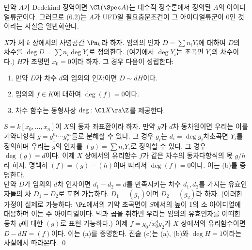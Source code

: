 	
	\begin{example}
	만약 $A$가 Dedekind 정역이면 $\Cl(\Spec A)$는 대수적 정수론에서 정의된 $A$의 아이디얼류군이다.
	그러므로 (6.2)는 $A$가 UFD일 필요충분조건이 그 아이디얼류군이 0인 것이라는 사실을 일반화한다.
	\end{example}
	
	
	\begin{proposition}
	$X$가 체 $k$ 상에서의 사영공간 $\Pn_k$라 하자.
	임의의 인자 $D=\sum n_iY_i$에 대하여 $D$의 차수를 $\deg D=\sum n_i\deg Y_i$로 정의한다.
	(여기에서 $\deg Y_i$는 초곡면 $Y_i$의 차수이다.) $H$가 초평면 $x_0=0$이라 하자. 그 경우 다음이 성립한다:
	\begin{enumerate}[label=(\alph*)]
	\item 만약 $D$가 차수 $d$의 임의의 인자이면 $D\sim dH$이다.
	\item 임의의 $f\in K$에 대하여 $\deg(f)=0$이다.
	\item 차수 함수는 동형사상 $\deg:\Cl X\ra\Z$를 제공한다.\\
	\end{enumerate}
	\pf $S=k[x_0,\ldots,x_n]$이 $X$의 동차 좌표환이라 하자.
	만약 $g$가 $d$차 동차원이면 우리는 이를 기약다항식 $g=g_1^{n_1}\cdots g_r^{n_r}$들로 분해할 수 있다.
	그 경우 $g_i$는 $d_i=\deg g_i$차초곡면 $Y_i$를 정의하며 우리는 $g$의 인자를 $(g)=\sum n_iY_i$로 정의할 수 있다.
	그 경우 $\deg(g)=d$이다. 이제 $X$ 상에서의 유리함수 $f$가 같은 차수의 동차다항식의 몫 $g/h$라 하자.
	명백히 $(f)=(g)-(h)$이며 따라서 $\deg(f)=0$이다. 이는 (b)를 증명한다.\\
	만약 $D$가 임의의 $d$차 인자이면 $d_1-d_2=d$를 만족시키는 차수 $d_1,d_2$를 가지는 유효인자들의 차 $D_1-D_2$로 표현 가능하다.
	$D_1=(g_1)$이며 $D_2=(g_2)$라 하자. (이러한 가정이 실제로 가능하다:
	$\Pn$에서의 기약 초곡면이 $S$에서의 높이 1의 소 아이디얼에 대응하며 이는 주 아이디얼이다.
	멱과 곱을 취하면 우리는 임의의 유효인자를 어떠한 동차 $g$에 대한 $(g)$로 표현 가능하다.)
	이제 $f=g_0/x_0^dg_2$가 $X$ 상에서의 유리함수이면 $D-dH=(f)$이다. 이는 (a)를 증명한다.
	진술 (c)는 (a), (b)와 $\deg H=1$이라는 사실에서 따라온다.
	\qed
	\end{proposition}
	
